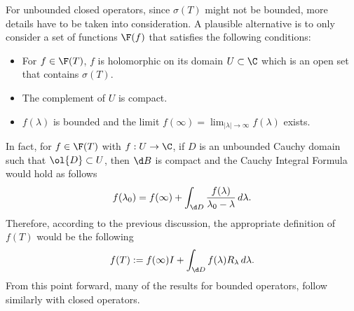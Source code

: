 For unbounded closed operators, since $\sigma(T)$ might not be bounded, more details have to be taken into consideration. A plausible alternative is to only consider a set of functions $\F(f)$ that satisfies the following conditions:
\begin{itemize}
    \item For $f \in \F(T)$, $f$ is holomorphic on its domain $U\subset \C$ which is an open set that contains $\sigma(T)$.
    \item The complement of $U$ is compact.
    \item $f(\lambda)$ is bounded and the limit $f(\infty) = \lim_{|\lambda|\to\infty}f(\lambda)$ exists.
\end{itemize}

In fact, for $f\in \F(T)$ with $f: U \to \C$, if $D$ is an unbounded Cauchy domain such that $\ol{D} \subset U$, then $\d B$ is compact and the Cauchy Integral Formula would hold as follows
\[ f(\lambda_0) = f(\infty) + \int_{\d D}  \frac{f(\lambda)}{\lambda_0-\lambda}\, d\lambda. \]
Therefore, according to the previous discussion, the appropriate definition of $f(T)$ would be the following
\[ f(T) :=  f(\infty) I + \int_{\d D} f(\lambda) R_\lambda\, d\lambda.\]
From this point forward, many of the results for bounded operators, follow similarly with closed operators.


